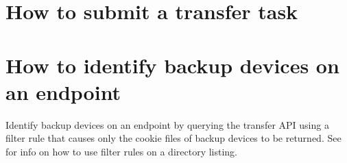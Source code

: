 
\section{How to submit a transfer task}


\section{How to identify backup devices on an endpoint\label{appendix:identifybackupdevices}}

Identify backup devices on an endpoint by querying the transfer API
using a filter rule that causes only the cookie files of backup devices
to be returned. See  for info
on how to use filter rules on a directory listing.